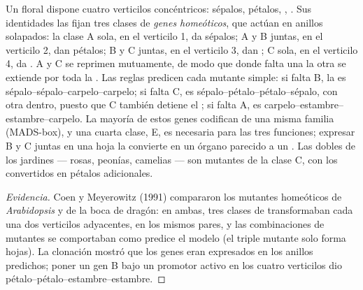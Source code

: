 \begin{proposition}\label{prop:b2:plant-flowering:abc}
Un  floral dispone cuatro verticilos concéntricos: sépalos,
pétalos, , . Sus identidades las fijan tres clases de
\emph{genes homeóticos}, que actúan en anillos solapados: la clase A sola,
en el verticilo 1, da sépalos; A y B juntas, en el verticilo 2, dan
pétalos; B y C juntas, en el verticilo 3, dan ; C sola, en el
verticilo 4, da . A y C se reprimen mutuamente, de modo que donde
falta una la otra se extiende por toda la . Las reglas predicen cada
mutante simple: si falta B, la  es sépalo--sépalo--carpelo--carpelo; si
falta C, es sépalo--pétalo--pétalo--sépalo, con otra  dentro, puesto
que C también detiene el ; si falta A, es
carpelo--estambre--estambre--carpelo. La mayoría de estos genes codifican
 de una misma familia (MADS-box), y una cuarta
clase, E, es necesaria para las tres funciones; expresar B y C juntas en
una hoja la convierte en un órgano parecido a un . Las 
dobles de los jardines --- rosas, peonías, camelias --- son mutantes de la
clase C, con los  convertidos en pétalos adicionales.
\end{proposition}
\begin{proof}[Evidencia]
Coen y Meyerowitz (1991) compararon los mutantes homeóticos de
\emph{Arabidopsis} y de la boca de dragón: en ambas, tres clases de
 transformaban cada una dos verticilos adyacentes, en los mismos
pares, y las combinaciones de mutantes se comportaban como predice el
modelo (el triple mutante solo forma hojas). La clonación mostró que los
genes eran  expresados en los anillos
predichos; poner un gen B bajo un promotor activo en los cuatro
verticilos dio pétalo--pétalo--estambre--estambre.
\end{proof}

